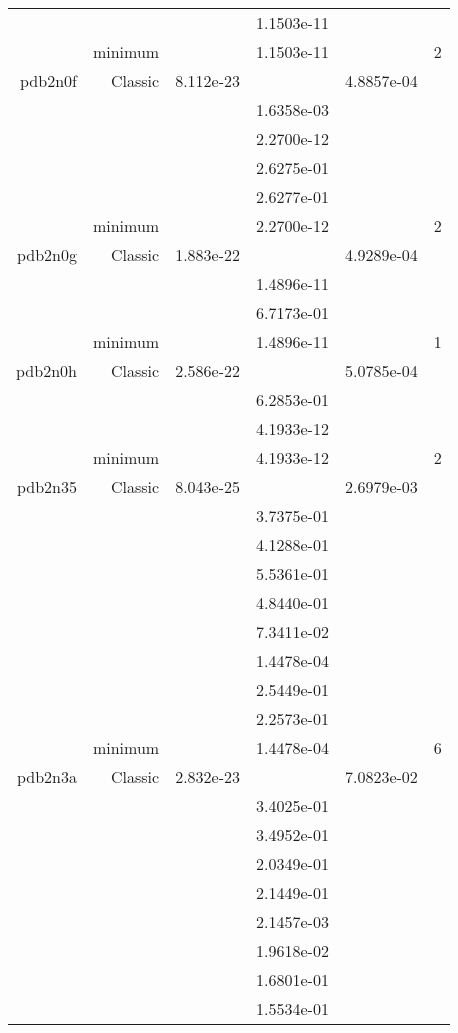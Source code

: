 \begin{xltabular}{\textwidth}{r|rS[table-format=1.3e+2]S[table-format=1.4e+2]S[table-format=1.4e+2]S[table-format=-1.5]}
&  &  & 1.1503e-11 & & \\
& minimum &  & 1.1503e-11 & & 2 \\  \addlinespace
pdb2n0f & Classic & 8.112e-23 &  & 4.8857e-04 & \\
&  &  & 1.6358e-03 & & \\
&  &  & 2.2700e-12 & & \\
&  &  & 2.6275e-01 & & \\
&  &  & 2.6277e-01 & & \\
& minimum &  & 2.2700e-12 & & 2 \\  \addlinespace
pdb2n0g & Classic & 1.883e-22 &  & 4.9289e-04 & \\
&  &  & 1.4896e-11 & & \\
&  &  & 6.7173e-01 & & \\
& minimum &  & 1.4896e-11 & & 1 \\  \addlinespace
pdb2n0h & Classic & 2.586e-22 &  & 5.0785e-04 & \\
&  &  & 6.2853e-01 & & \\
&  &  & 4.1933e-12 & & \\
& minimum &  & 4.1933e-12 & & 2 \\  \addlinespace
pdb2n35 & Classic & 8.043e-25 &  & 2.6979e-03 & \\
&  &  & 3.7375e-01 & & \\
&  &  & 4.1288e-01 & & \\
&  &  & 5.5361e-01 & & \\
&  &  & 4.8440e-01 & & \\
&  &  & 7.3411e-02 & & \\
&  &  & 1.4478e-04 & & \\
&  &  & 2.5449e-01 & & \\
&  &  & 2.2573e-01 & & \\
& minimum &  & 1.4478e-04 & & 6 \\  \addlinespace
pdb2n3a & Classic & 2.832e-23 &  & 7.0823e-02 & \\
&  &  & 3.4025e-01 & & \\
&  &  & 3.4952e-01 & & \\
&  &  & 2.0349e-01 & & \\
&  &  & 2.1449e-01 & & \\
&  &  & 2.1457e-03 & & \\
&  &  & 1.9618e-02 & & \\
&  &  & 1.6801e-01 & & \\
&  &  & 1.5534e-01 & & \\

\end{xltabular}
